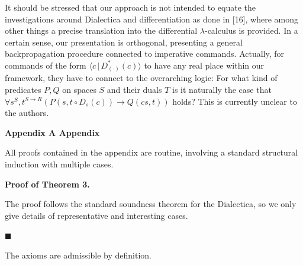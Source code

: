 \documentclass[10pt,a4paper]{article}
\begin{document}
 
 
It should be stressed that our approach is not intended to equate the investigations around Dialectica and differentiation as done in [16], where among other things a precise translation into the differential $\lambda$-calculus is provided. In a certain sense, our presentation is orthogonal, presenting a general backpropagation procedure connected to imperative commands. Actually, for commands of the form $\langle{c}\,|\,{D^{\ast}_{(\cdot)}({c})}\rangle$ to have any real place within our framework, they have to connect to the overarching logic: For what kind of predicates $P,Q$ on spaces $S$ and their duals $T$ is it naturally the case that $\forall s^{S},t^{S\to R}\left(P(s,t\circ D_{s}({c}))\to Q(cs,t)\right)$ holds? This is currently unclear to the authors.\par
 
 
 



 
\par\medskip\noindent\textbf{Appendix A Appendix}\par
 
 
All proofs contained in the appendix are routine, involving a standard structural induction with multiple cases.\par
 
 
 
\par\medskip\noindent\textbf{Proof of Theorem 3.}\par
 
 
The proof follows the standard soundness theorem for the Dialectica, so we only give details of representative and interesting cases.\par
  
\par\noindent  $\blacksquare$ 
 
The axioms are admissible by definition.\par
 
 
\end{document}
